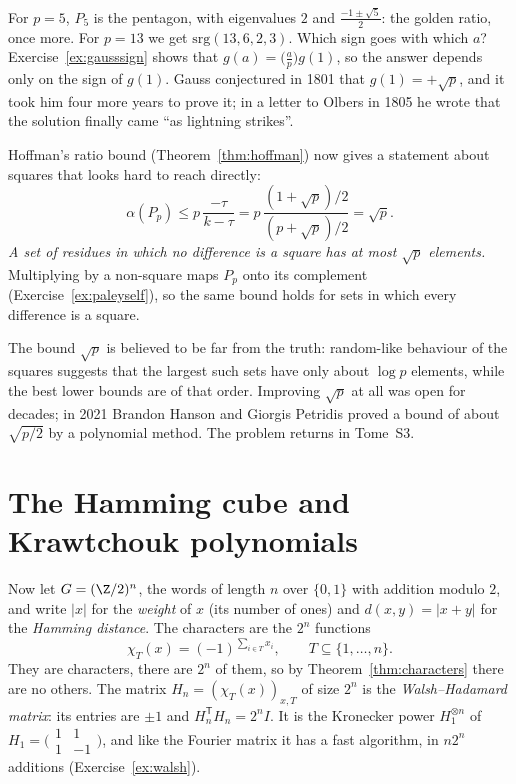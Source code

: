 For $p=5$, $P_5$ is the pentagon, with eigenvalues $2$ and $\frac{-1\pm\sqrt5}2$: the golden ratio, once more. For $p=13$ we get
$\mathrm{srg}(13,6,2,3)$. Which sign goes with which $a$? Exercise~\ref{ex:gausssign} shows that $g(a)=\bigl(\frac ap\bigr)g(1)$,
so the answer depends only on the sign of $g(1)$. Gauss conjectured in 1801 that $g(1)=+\sqrt p$, and it took him four more years
to prove it; in a letter to Olbers in 1805 he wrote that the solution finally came ``as lightning strikes''.

Hoffman's ratio bound (Theorem~\ref{thm:hoffman}) now gives a statement about squares that looks hard to reach directly:
\[
\alpha(P_p)\le p\,\frac{-\tau}{k-\tau}=p\,\frac{(1+\sqrt p)/2}{(p+\sqrt p)/2}=\sqrt p.
\]
\emph{A set of residues in which no difference is a square has at most $\sqrt p$ elements.} Multiplying by a non-square maps
$P_p$ onto its complement (Exercise~\ref{ex:paleyself}), so the same bound holds for sets in which every difference is a square.

\begin{remark}
The bound $\sqrt p$ is believed to be far from the truth: random-like behaviour of the squares suggests that the largest such sets
have only about $\log p$ elements, while the best lower bounds are of that order. Improving $\sqrt p$ at all was open for decades;
in 2021 Brandon Hanson and Giorgis Petridis proved a bound of about $\sqrt{p/2}$ by a polynomial method. The problem returns in
Tome~S3.
\end{remark}

\section{The Hamming cube and Krawtchouk polynomials}

Now let $G=(\Z/2)^n$, the words of length $n$ over $\{0,1\}$ with addition modulo $2$, and write $|x|$ for the \emph{weight} of $x$
(its number of ones) and $d(x,y)=|x+y|$ for the \emph{Hamming distance}. The characters are the $2^n$ functions
\[
\chi_T(x)=(-1)^{\sum_{i\in T}x_i},\qquad T\subseteq\{1,\dots,n\}.
\]
They are characters, there are $2^n$ of them, so by Theorem~\ref{thm:characters} there are no others. The matrix $H_n=(\chi_T(x))
_{x,T}$ of size $2^n$ is the \emph{Walsh--Hadamard matrix}: its entries are $\pm1$ and $H_n^{\mathsf T}H_n=2^nI$. It is the
Kronecker power $H_1^{\otimes n}$ of $H_1=\bigl(\begin{smallmatrix}1&1\\1&-1\end{smallmatrix}\bigr)$, and like the Fourier matrix it
has a fast algorithm, in $n2^n$ additions (Exercise~\ref{ex:walsh}).

